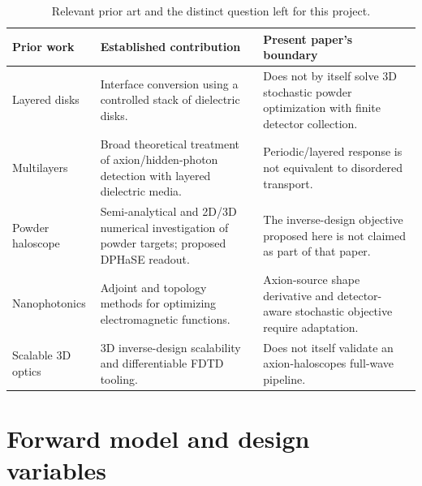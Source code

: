 \documentclass[10.5pt,a4paper]{article}
\begin{document}
\begin{table}[H]
\centering\small
\caption{Relevant prior art and the distinct question left for this project.}
\begin{tabularx}{\textwidth}{p{}p{}Y}
\toprule
Prior work & Established contribution & Present paper's boundary\\
\midrule
Layered disks \parencite{MADMAX2017} & Interface conversion using a controlled stack of dielectric disks. & Does not by itself solve 3D stochastic powder optimization with finite detector collection.\\
Multilayers \parencite{Baryakhtar2018} & Broad theoretical treatment of axion/hidden-photon detection with layered dielectric media. & Periodic/layered response is not equivalent to disordered transport.\\
Powder haloscope \parencite{Koppell2026} & Semi-analytical and 2D/3D numerical investigation of powder targets; proposed DPHaSE readout. & The inverse-design objective proposed here is not claimed as part of that paper.\\
Nanophotonics \parencite{Molesky2018,LalauKeraly2013} & Adjoint and topology methods for optimizing electromagnetic functions. & Axion-source shape derivative and detector-aware stochastic objective require adaptation.\\
Scalable 3D optics \parencite{Schul2026,Mahlau2026} & 3D inverse-design scalability and differentiable FDTD tooling. & Does not itself validate an axion-haloscopes full-wave pipeline.\\
\bottomrule
\end{tabularx}
\end{table}

\section{Forward model and design variables}
\end{document}
